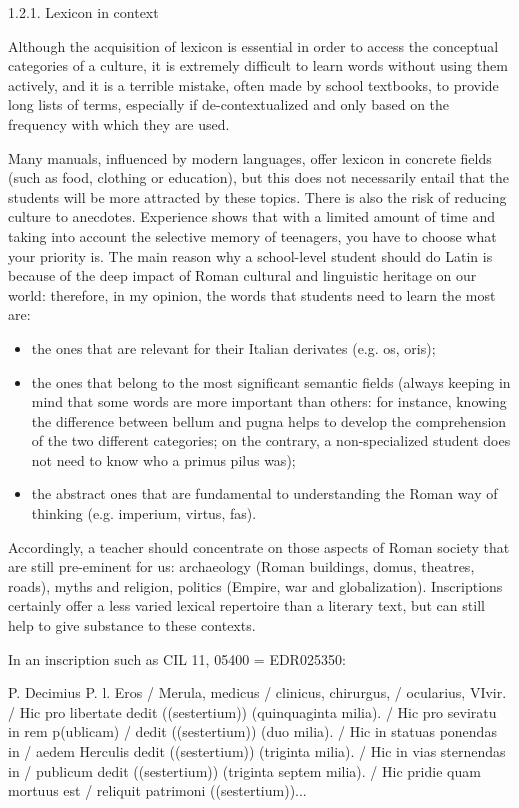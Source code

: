 \documentclass[amsthm,ebook]{saparticle}
\begin{document}
\bigskip

1.2.1. Lexicon in context

Although the acquisition of lexicon is essential in order to access the conceptual categories of a culture, it is
extremely difficult to learn words without using them actively, and it is a terrible mistake, often made by school
textbooks, to provide long lists of terms, especially if de-contextualized and only based on the frequency with which
they are used.

Many manuals, influenced by modern languages, offer lexicon in concrete fields (such as food, clothing or education),
but this does not necessarily entail that the students will be more attracted by these topics. There is also the risk
of reducing culture to anecdotes. Experience shows that with a limited amount of time and taking into account the
selective memory of teenagers, you have to choose what your priority is. The main reason why a school-level student
should do Latin is because of the deep impact of Roman cultural and linguistic heritage on our world: therefore, in my
opinion, the words that students need to learn the most are:

\begin{itemize}
\item the ones that are relevant for their Italian derivates (e.g. os, oris);
\item the ones that belong to the most significant semantic fields (always keeping in mind that some words are more
important than others: for instance, knowing the difference between bellum and pugna helps to develop the comprehension
of the two different categories; on the contrary, a non-specialized student does not need to know who a primus pilus
was);
\item the abstract ones that are fundamental to understanding the Roman way of thinking (e.g. imperium, virtus, fas).
\end{itemize}
Accordingly, a teacher should concentrate on those aspects of Roman society that are still pre-eminent for us:
archaeology (Roman buildings, domus, theatres, roads), myths and religion, politics (Empire, war and globalization).
Inscriptions certainly offer a less varied lexical repertoire than a literary text, but can still help to give
substance to these contexts.

In an inscription such as CIL 11, 05400 = EDR025350:

P. Decimius P. l. Eros / Merula, medicus / clinicus, chirurgus, / ocularius, VIvir. / Hic pro libertate dedit
((sestertium)) (quinquaginta milia). / Hic pro seviratu in rem p(ublicam) / dedit ((sestertium)) (duo milia). / Hic in
statuas ponendas in / aedem Herculis dedit ((sestertium)) (triginta milia). / Hic in vias sternendas in / publicum
dedit ((sestertium)) (triginta septem milia). / Hic pridie quam mortuus est / reliquit patrimoni ((sestertium))... 
\end{document}
